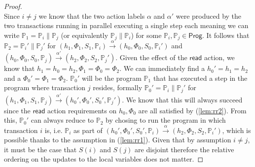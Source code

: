\begin{lem}
\begin{proof}
\[	\]
	Since $i \neq j$ we know that the two action labels $\alpha$ and $\alpha'$ were produced by the two transactions running in parallel executing a single step each meaning we can write $\mathds{P}_1 = \mathds{P}_i \| \mathds{P}_j$ (or equivalently $\mathds{P}_j \| \mathds{P}_i$) for some $\mathds{P}_i, \mathds{P}_j \in \mathsf{Prog}$. It follows that $\mathds{P}_2 = \mathds{P}_i' \| \mathds{P}_j'$ for $(h_1, \Phi_1, S_1, \mathds{P}_i) \xrightarrow{\alpha} (h_0, \Phi_0, S_0, \mathds{P}_i')$ and $(h_0, \Phi_0, S_0, \mathds{P}_j) \xrightarrow{\alpha'} (h_2, \Phi_2, S_2, \mathds{P}_j')$. Given the effect of the $\mathsf{read}$ action, we know that $h_1 = h_0 = h_2, \Phi_1 = \Phi_0 = \Phi_2$. We can immediately find a $h_0' = h_1 = h_2$ and a $\Phi_0' = \Phi_1 = \Phi_2$. $\mathds{P}_0'$ will be the program $\mathds{P}_1$ that has executed a step in the program where transaction $j$ resides, formally $\mathds{P}_0' = \mathds{P}_i \| \mathds{P}_j'$ for $(h_1, \Phi_1, S_1, \mathds{P}_j) \xrightarrow{\alpha'} (h_0', \Phi_0', S_0', \mathds{P}_j')$. We know that this will always succeed since the $\mathsf{read}$ action requirements on $h_0, \Phi_0$ are all satisfied by (\ref{lem:rr2}). From this, $\mathds{P}_0'$ can always reduce to $\mathds{P}_2$ by chosing to run the program in which transaction $i$ is, i.e. $\mathds{P}_i$ as part of $(h_0', \Phi_0', S_0', \mathds{P}_i) \xrightarrow{\alpha} (h_2, \Phi_2, S_2, \mathds{P}_i')$, which is possible thanks to the assumption in (\ref{lem:rr1}). Given that by assumption $i \neq j$, it must be the case that $S(i)$ and $S(j)$ are disjoint therefore the relative ordering on the updates to the local variables does not matter.
	\end{proof}
\end{lem}

